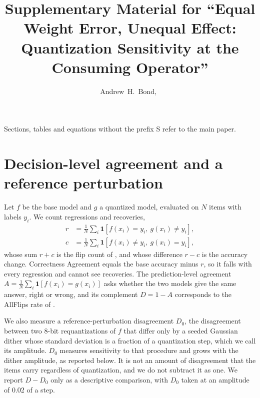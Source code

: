 \documentclass[journal,onecolumn]{IEEEtran}
\newif\ifanon
\begin{document}
\title{Supplementary Material for ``Equal Weight Error, Unequal Effect: Quantization Sensitivity
at the Consuming Operator''}

\ifanon
\author{Anonymous Authors}
\else
\author{Andrew~H.~Bond,~}
\fi

\maketitle

Sections, tables and equations without the prefix S refer to the main paper.

\section{Decision-level agreement and a reference perturbation}\label{supp:agree}

Let $f$ be the base model and $g$ a quantized model, evaluated on $N$ items with labels $y_i$.
We count regressions and recoveries,
\begin{equation}
\begin{aligned}
r &= \frac{1}{N}\sum_i \mathbf{1}[f(x_i)=y_i,\ g(x_i)\neq y_i],\\
c &= \frac{1}{N}\sum_i \mathbf{1}[f(x_i)\neq y_i,\ g(x_i)=y_i],
\end{aligned}
\end{equation}
whose sum $r+c$ is the flip count of \citet{dutta2024accuracy}, and whose difference $r-c$ is
the accuracy change. Correctness Agreement \citep{rababah2026illusion} equals the base
accuracy minus $r$, so it falls with every regression and cannot see recoveries. The
prediction-level agreement $A = \frac{1}{N}\sum_i \mathbf{1}[f(x_i)=g(x_i)]$ asks whether the
two models give the same answer, right or wrong, and its complement $D = 1-A$ corresponds to
the AllFlips rate of \citet{dutta2024accuracy}.

We also measure a reference-perturbation disagreement $D_0$, the disagreement between two
8-bit requantizations of $f$ that differ only by a seeded Gaussian dither whose standard
deviation is a fraction of a quantization step, which we call its amplitude. $D_0$ measures sensitivity to that procedure and grows with the dither amplitude, as
reported below. It is not an amount of disagreement that the items carry regardless of
quantization, and we do not subtract it as one. We report $D - D_0$ only as a descriptive
comparison, with $D_0$ taken at an amplitude of 0.02 of a step.
\end{document}
